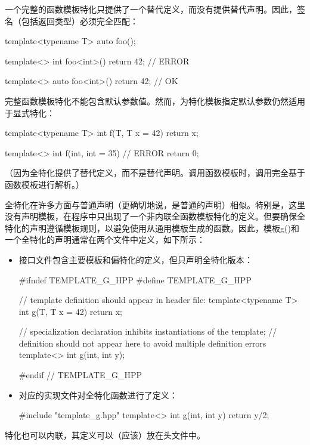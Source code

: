 一个完整的函数模板特化只提供了一个替代定义，而没有提供替代声明。因此，签名（包括返回类型）必须完全匹配：

\begin{cpp}
template<typename T> auto foo();

template<> int foo<int>() { return 42; }  // ERROR

template<> auto foo<int>() { return 42; } // OK
\end{cpp}

完整函数模板特化不能包含默认参数值。然而，为特化模板指定默认参数仍然适用于显式特化：

\begin{cpp}
template<typename T>
int f(T, T x = 42)
{
	return x;
}

template<> int f(int, int = 35) // ERROR
{
	return 0;
}
\end{cpp}

（因为全特化提供了替代定义，而不是替代声明。调用函数模板时，调用完全基于函数模板进行解析。）

全特化在许多方面与普通声明（更确切地说，是普通的声明）相似。特别是，这里没有声明模板，在程序中只出现了一个非内联全函数模板特化的定义。但要确保全特化的声明遵循模板规则，以避免使用从通用模板生成的函数。因此，模板g()和一个全特化的声明通常在两个文件中定义，如下所示：

\begin{itemize}
\item 
接口文件包含主要模板和偏特化的定义，但只声明全特化版本：

\begin{cpp}
#ifndef TEMPLATE_G_HPP
#define TEMPLATE_G_HPP

// template definition should appear in header file:
template<typename T>
int g(T, T x = 42)
{
	return x;
}

// specialization declaration inhibits instantiations of the template;
// definition should not appear here to avoid multiple definition errors
template<> int g(int, int y);

#endif // TEMPLATE_G_HPP
\end{cpp}

\item 
对应的实现文件对全特化函数进行了定义：

\begin{cpp}
#include "template_g.hpp"
template<> int g(int, int y)
{
	return y/2;
}
\end{cpp}
\end{itemize}

特化也可以内联，其定义可以（应该）放在头文件中。

